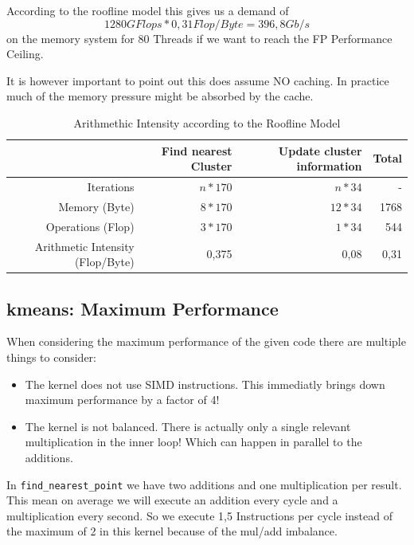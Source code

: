 According to the roofline model this gives us a demand of $$ 1280GFlops * 0,31Flop/Byte = 396,8 Gb/s$$ on the memory system for 80 Threads if
we want to reach the FP Performance Ceiling.

It is however important to point out this does assume NO caching. In practice much of the memory pressure might be absorbed by the cache.

\begin{table}[ht]
	\centering
	\caption{Arithmethic Intensity according to the Roofline Model}
	\label{tab:AI}
	\begin{tabular}{|r|r|r|r|}
		\hline
		& Find nearest Cluster & Update cluster information & Total \\ \hline
		Iterations           & $n * 170$            & $n*34$                     & -     \\ \hline
		Memory (Byte)              & $8*170$              & $12*34$                      & 1768  \\ \hline
		Operations (Flop)          & $3*170$              & $1*34$                       & 544   \\ \hline
		Arithmetic Intensity (Flop/Byte) & 0,375                & 0,08                       & 0,31  \\ \hline
	\end{tabular}
\end{table}

\subsection{kmeans: Maximum Performance}

When considering the maximum performance of the given code there are multiple things to consider:

\begin{itemize}
	\item The kernel does not use SIMD instructions. This immediatly brings down maximum performance by a factor of 4!
	\item The kernel is not balanced. There is actually only a single relevant multiplication in the inner loop! Which can happen in parallel to the additions.
\end{itemize}

In \texttt{find\_nearest\_point} we have two additions and one multiplication per result. This mean on average we will execute an addition every cycle and a multiplication every second.
So we execute 1,5 Instructions per cycle instead of the maximum of 2 in this kernel because of the mul/add imbalance.


